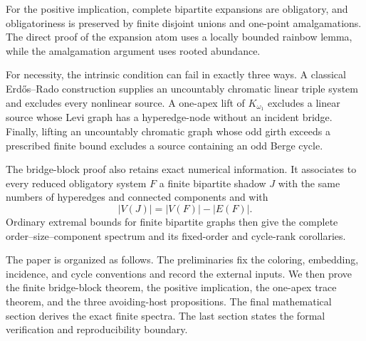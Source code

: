 For the positive implication, complete bipartite expansions are obligatory, and
obligatoriness is preserved by finite disjoint unions and one-point
amalgamations.  The direct proof of the expansion atom uses a locally bounded
rainbow lemma, while the amalgamation argument uses rooted abundance.

For necessity, the intrinsic condition can fail in exactly three ways.
A classical Erdős--Rado construction supplies an uncountably chromatic linear
triple system and excludes every nonlinear source.  A one-apex lift of
$K_{\omega_1}$ excludes a linear source whose Levi graph has a hyperedge-node
without an incident bridge.  Finally, lifting an uncountably chromatic graph
whose odd girth exceeds a prescribed finite bound excludes a source containing
an odd Berge cycle.

The bridge-block proof also retains exact numerical information.  It associates
to every reduced obligatory system $F$ a finite bipartite shadow $J$ with the
same numbers of hyperedges and connected components and with
\[
|V(J)|=|V(F)|-|E(F)|.
\]
Ordinary extremal bounds for finite bipartite graphs then give the complete
order--size--component spectrum and its fixed-order and cycle-rank corollaries.

The paper is organized as follows.  The preliminaries fix the coloring,
embedding, incidence, and cycle conventions and record the external inputs.
We then prove the finite bridge-block theorem, the positive implication, the
one-apex trace theorem, and the three avoiding-host propositions.  The final
mathematical section derives the exact finite spectra.  The last section states
the formal verification and reproducibility boundary.